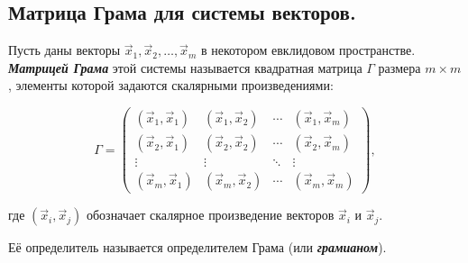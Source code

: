 \subsection{
    Матрица Грама для системы векторов.
}
    
\begin{definition}
    Пусть даны векторы \( \vec{x}_1, \vec{x}_2, \dots, \vec{x}_m \) в некотором евклидовом пространстве. \textit{\textbf{Матрицей Грама}} этой системы называется квадратная матрица \( \Gamma \) размера \( m \times m \), элементы которой задаются скалярными произведениями:

    \[
    \Gamma = \begin{pmatrix}
    (\vec{x}_1, \vec{x}_1) & (\vec{x}_1, \vec{x}_2) & \cdots & (\vec{x}_1, \vec{x}_m) \\
    (\vec{x}_2, \vec{x}_1) & (\vec{x}_2, \vec{x}_2) & \cdots & (\vec{x}_2, \vec{x}_m) \\
    \vdots     & \vdots     & \ddots & \vdots     \\
    (\vec{x}_m, \vec{x}_1) & (\vec{x}_m, \vec{x}_2) & \cdots & (\vec{x}_m, \vec{x}_m)
    \end{pmatrix},
    \]
    
    где \( (\vec{x}_i, \vec{x}_j) \) обозначает скалярное произведение векторов \( \vec{x}_i \) и \( \vec{x}_j \).
\end{definition}

Её определитель называется определителем Грама (или \textbf{\textit{грамианом}}).
